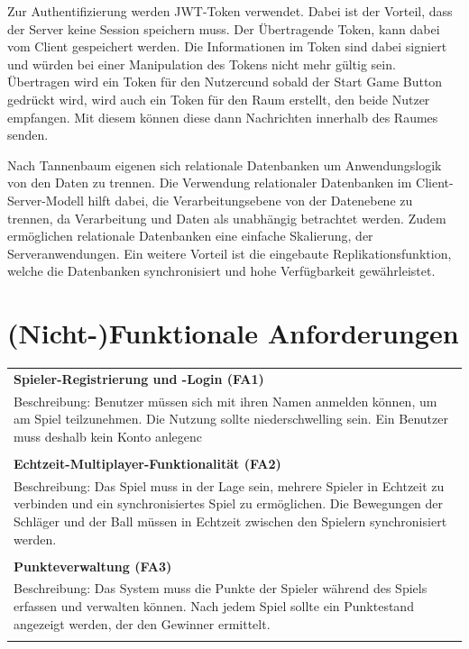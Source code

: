 \documentclass[
]{article}
\begin{document}
Zur Authentifizierung werden JWT-Token verwendet. Dabei ist der Vorteil, dass der Server keine Session speichern muss.
Der Übertragende Token, kann dabei vom Client gespeichert werden. Die Informationen im Token sind
dabei signiert und würden bei einer Manipulation des Tokens nicht mehr gültig sein.
Übertragen wird ein Token für den Nutzercund sobald der Start Game Button gedrückt wird, wird auch 
ein Token für den Raum erstellt, den beide Nutzer empfangen.
Mit diesem können diese dann Nachrichten innerhalb des Raumes senden.

Nach Tannenbaum eigenen sich relationale Datenbanken um Anwendungslogik von den Daten zu trennen.
\glqq Die Verwendung relationaler Datenbanken im Client-Server-Modell hilft dabei, 
die Verarbeitungsebene von der Datenebene zu trennen, da Verarbeitung und Daten als unabhängig betrachtet werden.\grqq{} \cite[S. 40 ff.]{tanenbaum2007distributed}
Zudem ermöglichen relationale Datenbanken eine einfache Skalierung, der Serveranwendungen.
Ein weitere Vorteil ist die eingebaute Replikationsfunktion, welche die Datenbanken synchronisiert und hohe Verfügbarkeit gewährleistet.\cite[Chapter 27]{postgresql-high-availability}


\section{(Nicht-)Funktionale Anforderungen}
\begin{center}
  \begin{tabular}{|p{\linewidth}|}
    \hline
    \textbf{Spieler-Registrierung und -Login (FA1)} \\
    Beschreibung: Benutzer müssen sich mit ihren Namen anmelden können, um am Spiel teilzunehmen.
    Die Nutzung sollte niederschwelling sein. Ein Benutzer muss deshalb kein Konto anlegenc \\ \\
    \hline
    \textbf{Echtzeit-Multiplayer-Funktionalität (FA2)} \\
    Beschreibung: Das Spiel muss in der Lage sein, mehrere Spieler in Echtzeit zu verbinden und ein synchronisiertes Spiel zu ermöglichen. Die Bewegungen der Schläger und der Ball müssen in Echtzeit zwischen den Spielern synchronisiert werden.\\ \\
    \hline
    \textbf{Punkteverwaltung (FA3)} \\
    Beschreibung: Das System muss die Punkte der Spieler während des Spiels erfassen und verwalten können. Nach jedem Spiel sollte ein Punktestand angezeigt werden, der den Gewinner ermittelt. \\ \\
    \hline
  \end{tabular}
\end{center}
\end{document}
